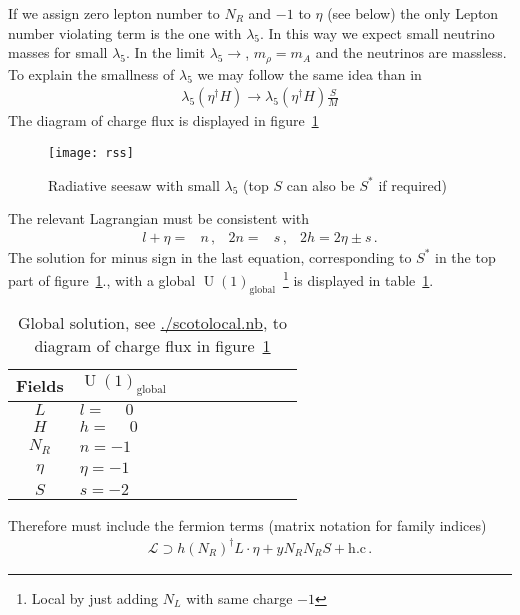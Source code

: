 If we assign zero lepton number to $N_R$ and $-1$ to $\eta$ (see below) the only Lepton number violating term is the one with $\lambda_5$. In this way we expect small neutrino masses for small $\lambda_5$. In the limit $\lambda_5\to $, $m_{\rho}=m_A$ and the neutrinos are massless.
To explain the smallness of $\lambda_5$ we may follow the same idea than in~\cite{Suematsu:2017kcu}
\begin{align}
  \lambda_5 \left( \eta^{\dagger}H \right) \to    \lambda_5 \left( \eta^{\dagger}H \right) \frac{S}{M}
\end{align}
The diagram of charge flux is displayed in figure~\ref{fig:rss}
\begin{figure}
  \centering
  \texttt{[image: rss]}
  \caption{Radiative seesaw with small $\lambda_5$ (top $S$ can also be $S^{*}$ if required)}
  \label{fig:rss}
\end{figure}

The relevant Lagrangian must be consistent with
\begin{align}
  l+\eta=&n\,,& 2n=&s\,, & 2h=2\eta\pm s\,.
\end{align}
The solution for minus sign in the last equation, corresponding to $S^*$ in the top part of figure~\ref{fig:rss}.,  with a global $\operatorname{U}(1)_{\text{global}}$~\cite{Suematsu:2017kcu}\footnote{Local by just adding $N_L$ with same charge $-1$} is displayed in table~\ref{tab:suematsu}.

\begin{table}
  \centering
  \begin{tabular}{c|ll}
    Fields&$\operatorname{U}(1)_{\text{global}}$& $\phantom{\operatorname{U}(1)_X}$\\ \hline
    $L$   & $l=\phantom{-}0$&$\phantom{l=-1}$\\
    $H$   & $h=\phantom{-}0$&$\phantom{h=-1-l=0}$\\
    $N_R$ & $n=-1$          &$\phantom{n=-1/2}$\\
    $\eta$& $\eta=-1$       &$\phantom{-1/2-l=1/2}$ \\
    $S$   & $s=-2$         &$\phantom{s=-1}$ \\
  \end{tabular}
  \caption{Global solution, see \url{./scotolocal.nb}, to diagram of charge flux in figure~\ref{fig:rss}}
  \label{tab:suematsu}
\end{table}


Therefore must include the fermion terms (matrix notation for family indices)
\begin{align}
  \mathcal{L}\supset h \left( N_R \right)^{\dagger} L \cdot \eta + y N_R N_R S + \text{h.c}\,.
\end{align}

